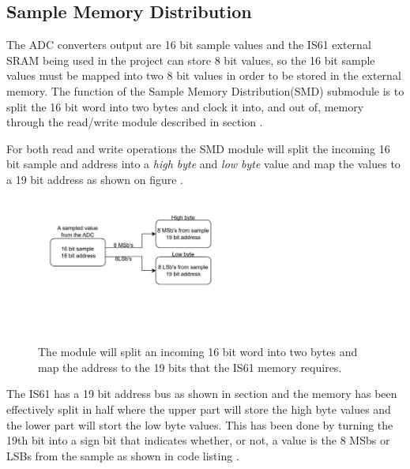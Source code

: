 \subsection{Sample Memory Distribution} \label{subsec:Sample_Memory_Distribution} 
The ADC converters output are 16 bit sample values and the IS61 external SRAM being used in the project can store 8 bit values, so the 16 bit sample values must be mapped into two 8 bit values in order to be stored in the external memory. The function of the Sample Memory Distribution(SMD) submodule is to split the 16 bit word into two bytes and clock it into, and out of, memory through the read/write module described in section .

For both read and write operations the SMD module will split the incoming 16 bit sample and address into a \textit{high byte} and \textit{low byte} value and map the values to a 19 bit address as shown on figure .

\begin{figure}[H]
    \centering
    \includegraphics[clip, trim=0 220 0 0, width=0.55\textwidth]{Sections/7_SystemDesign/Figures/7_2_6_1_MemoryDist.pdf}
    \caption{The module will split an incoming 16 bit word into two bytes and map the address to the 19 bits that the IS61 memory requires.}
    \label{fig:7_2_6_MemDist}
\end{figure}

The IS61 has a 19 bit address bus as shown in section  and the memory has been effectively split in half where the upper part will store the high byte values and the lower part will stort the low byte values. This has been done by turning the 19th bit into a sign bit that indicates whether, or not, a value is the 8 MSbs or LSBs from the sample as shown in code listing .



